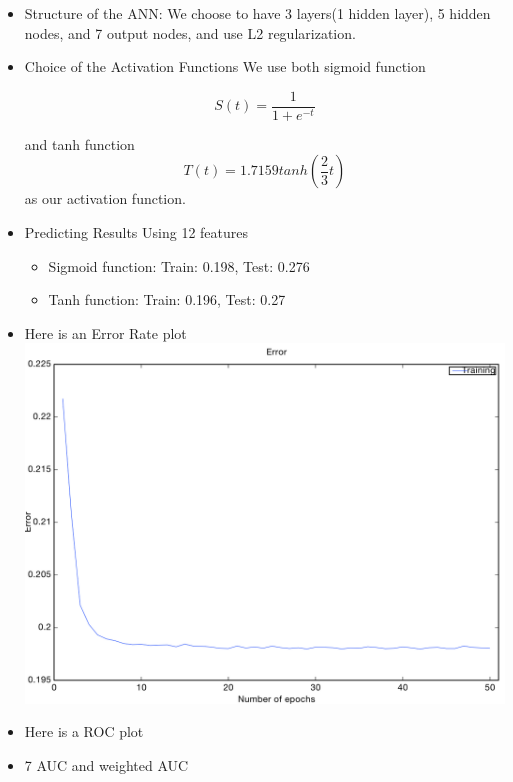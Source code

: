 \documentclass[11pt]{article}  %
\begin{document}
\begin{itemize}
\item Structure of the ANN:
We choose to have 3 layers(1 hidden layer), 5 hidden nodes, and 7 output nodes, and use L2 regularization.
\item Choice of the Activation Functions
We use both sigmoid function 

\begin{equation}
S(t) = \frac{1}{1 + e^{-t}}
\end{equation}

and tanh function 
\begin{equation}
T(t) = 1.7159tanh(\frac{2}{3}t)
\end{equation}
as our activation function.
\item Predicting Results Using 12 features
\begin{itemize}

\item Sigmoid function: Train: 0.198, Test: 0.276

\item Tanh function: Train: 0.196, Test: 0.27

\end{itemize}
\item Here is an Error Rate plot\\
\includegraphics[scale=0.4]{3-5-7With12Error}

\item Here is a ROC plot

\item 7 AUC and weighted AUC


\end{itemize}
\end{document}
